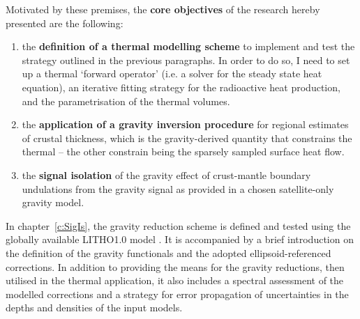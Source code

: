 Motivated by these premises, the \textbf{core objectives} of the research hereby presented are the following:
\begin{enumerate}
    \item the \textbf{definition of a thermal modelling scheme} to implement and test the strategy outlined in the previous paragraphs. In order to do so, I need to set up a thermal `forward operator' (i.e. a solver for the steady state heat equation), an iterative fitting strategy for the radioactive heat production, and the parametrisation of the thermal volumes.
    \item the \textbf{application of a gravity inversion procedure} for regional estimates of crustal thickness, which is the gravity-derived quantity that constrains the thermal -- the other constrain being the sparsely sampled surface heat flow.
    \item the \textbf{signal isolation} of the gravity effect of crust-mantle boundary undulations from the gravity signal as provided in a chosen satellite-only gravity model.
\end{enumerate}

In chapter~\ref{c:SigIs}, the gravity reduction scheme is defined and tested using the globally available {LITHO1.0} model \parencite{Pasyanos2014}.
It is accompanied by a brief introduction on the definition of the gravity functionals and the adopted ellipsoid-referenced corrections.
In addition to providing the means for the gravity reductions, then utilised in the thermal application, it also includes a spectral assessment of the modelled corrections and a strategy for error propagation of uncertainties in the depths and densities of the input models.

